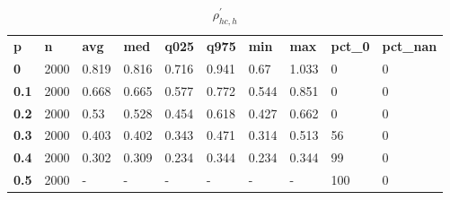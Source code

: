 \begin{table}[h]
 \centering 
\footnotesize
\caption{$\rho_{hc,h}^\prime $}
\label{tab:alphahch}
\begin{tabular}[h]{| l l l l l l l l l l|
    } \hline
\textbf{ p} & \textbf{ n} & \textbf{ avg} & \textbf{ med} & \textbf{ q025} & \textbf{ q975} & \textbf{ min} & \textbf{ max} & \textbf{ pct\_0} & \textbf{ pct\_nan}
           \\
  \textbf{  0} & 2000 & 0.819 & 0.816 & 0.716 & 0.941 &  0.67 & 1.033 &   0 & 0
           \\
  \textbf{0.1} & 2000 & 0.668 & 0.665 & 0.577 & 0.772 & 0.544 & 0.851 &   0 & 0
           \\
  \textbf{0.2} & 2000 &  0.53 & 0.528 & 0.454 & 0.618 & 0.427 & 0.662 &   0 & 0
           \\
  \textbf{0.3} & 2000 & 0.403 & 0.402 & 0.343 & 0.471 & 0.314 & 0.513 &  56 & 0
           \\
  \textbf{0.4} & 2000 & 0.302 & 0.309 & 0.234 & 0.344 & 0.234 & 0.344 &  99 & 0
           \\
  \textbf{0.5} & 2000 & - & - & - & - & - & - & 100 & 0
           \\
 \hline \end{tabular}
 \end{table}
